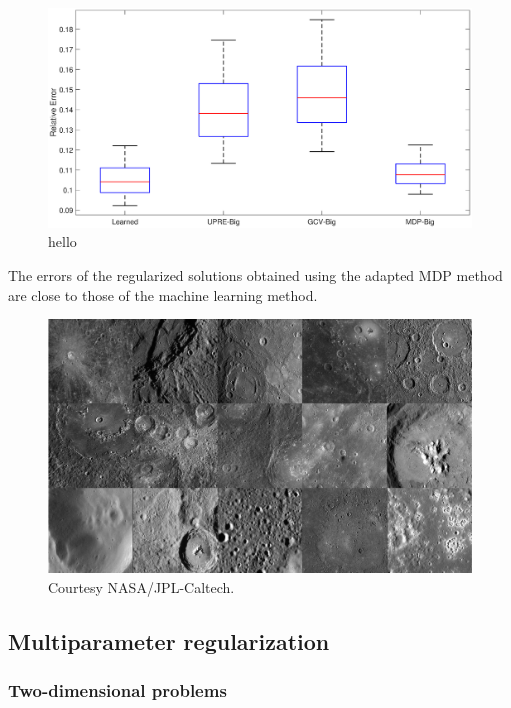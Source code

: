\documentclass[12pt]{article}
\begin{document}
\begin{figure}[ht]
\includegraphics[scale=0.36]{Figures/Errors2D_mri}
\caption{hello}
\label{fig:Errors 2D}
\end{figure}
The errors of the regularized solutions obtained using the adapted MDP method are close to those of the machine learning method.

\begin{figure}
\label{fig:MESSENGER True}
\includegraphics[scale=0.36]{Figures/MESSENGER}
\caption{Courtesy NASA/JPL-Caltech.}
\end{figure}

\subsection{Multiparameter regularization}

\subsubsection{Two-dimensional problems}
\end{document}
